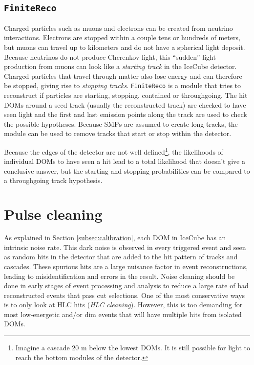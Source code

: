 
\subsection{\texttt{FiniteReco}}
\label{subsec:finitereco}
Charged particles such as muons and electrons can be created from neutrino interactions. Electrons are stopped within a couple tens or hundreds of meters, but muons can travel up to kilometers and do not have a spherical light deposit. Because neutrinos do not produce Cherenkov light, this ``sudden'' light production from muons can look like a \textit{starting track} in the IceCube detector. Charged particles that travel through matter also lose energy and can therefore be stopped, giving rise to \textit{stopping tracks}. \texttt{FiniteReco} is a module that tries to reconstruct if particles are starting, stopping, contained or throughgoing. The hit DOMs around a seed track (usually the reconstructed track) are checked to have seen light and the first and last emission points along the track are used to check the possible hypotheses. Because SMPs are assumed to create long tracks, the module can be used to remove tracks that start or stop within the detector.

Because the edges of the detector are not well defined\footnote{Imagine a cascade 20 m below the lowest DOMs. It is still possible for light to reach the bottom modules of the detector.}, the likelihoods of individual DOMs to have seen a hit lead to a total likelihood that doesn't give a conclusive answer, but the starting and stopping probabilities can be compared to a throughgoing track hypothesis.

\section{Pulse cleaning}
\label{sec:pulsecleaning}
As explained in Section \ref{subsec:calibration}, each DOM in IceCube has an intrinsic noise rate. This dark noise is observed in every triggered event and seen as random hits in the detector that are added to the hit pattern of tracks and cascades. These spurious hits are a large nuisance factor in event reconstructions, leading to misidentification and errors in the result. Noise cleaning should be done in early stages of event processing and analysis to reduce a large rate of bad reconstructed events that pass cut selections. One of the most conservative ways is to only look at HLC hits (\textit{HLC cleaning}). However, this is too demanding for most low-energetic and/or dim events that will have multiple hits from isolated DOMs. 

